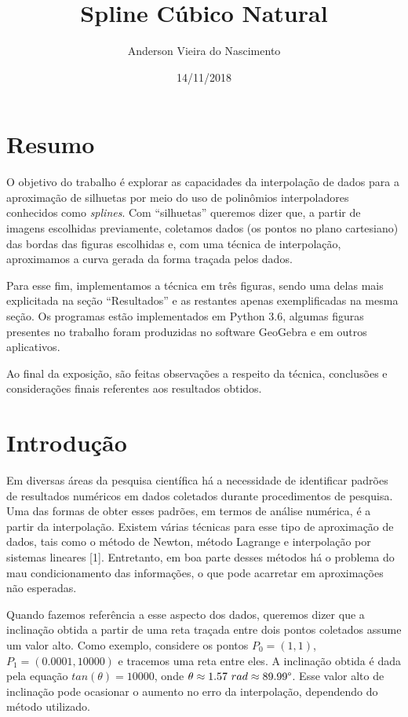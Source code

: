 \documentclass[11pt]{article}
\begin{document}
\title{Spline Cúbico Natural}
\author{Anderson Vieira do Nascimento}
\date{14/11/2018}
\maketitle

\section*{Resumo}

O objetivo do trabalho é explorar as capacidades
da interpolação de dados para a aproximação de silhuetas
por meio do uso de polinômios interpoladores conhecidos como
\textit{splines}. Com ``silhuetas'' queremos dizer que, a partir de imagens
escolhidas previamente, coletamos dados (os
pontos no plano cartesiano) das bordas das figuras escolhidas e, com uma
técnica de interpolação, aproximamos a curva gerada da forma
traçada pelos dados.

Para esse fim, implementamos a técnica em três figuras, sendo uma
delas mais explicitada na seção ``Resultados'' e as restantes apenas
exemplificadas na mesma seção. Os programas estão implementados em
Python 3.6, algumas figuras presentes no trabalho foram produzidas
no software GeoGebra e em outros aplicativos.

Ao final da exposição, são feitas observações a respeito da técnica, 
conclusões e considerações finais referentes aos resultados obtidos.

\section{Introdução}

Em diversas áreas da pesquisa científica há a necessidade
de identificar padrões de resultados numéricos em dados
coletados durante procedimentos de pesquisa. Uma das formas de obter esses padrões,
em termos de análise numérica, é a partir da interpolação. Existem várias
técnicas para esse tipo de aproximação de dados, tais como o
método de Newton, método Lagrange e interpolação por sistemas lineares [1]. 
Entretanto, em boa parte desses métodos há o problema do mau condicionamento 
das informações, o que pode acarretar em aproximações não esperadas.

Quando fazemos referência a esse aspecto dos dados, queremos dizer que
a inclinação obtida a partir de uma reta traçada entre dois pontos coletados
assume um valor alto. Como exemplo, considere os pontos
$P_0 = (1, 1)$, $P_1 = (0.0001, 10000)$ e tracemos uma reta entre eles.
A inclinação obtida é dada pela equação $tan(\theta) = 10000$, onde
$\theta \approx 1.57 \ rad \approx 89.99 \degree$. Esse valor alto de inclinação
pode ocasionar o aumento no erro da interpolação, dependendo do método
utilizado.
\end{document}
